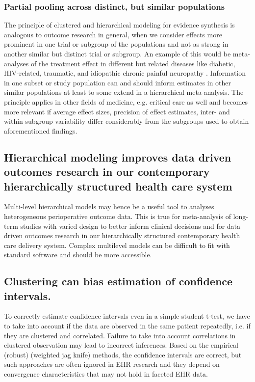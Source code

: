 \documentclass[11pt,notitlepage]{article}
\begin{document}
\subsubsection*{Partial pooling across distinct, but similar populations}
The principle  of clustered and hierarchical modeling for evidence synthesis is analogous to outcome research in general, when we consider effects more prominent in one trial or subgroup of the populations and not as strong in another similar but distinct trial or subgroup. An example of this would be meta-analyses of the treatment effect in different but related diseases like diabetic, HIV-related, traumatic, and idiopathic chronic painful neuropathy \cite{Andreae2015}. Information in one subset or study population can and should inform estimates in other similar populations at least to some extend in a hierarchical meta-analysis. The principle applies in other fields of medicine, e.g. critical care as well \cite{Roth2015CriticalCare} and becomes more relevant if average effect sizes, precision of effect estimates, inter- and within-subgroup variability differ considerably from the subgroups used to obtain aforementioned findings.

\subsection*{Hierarchical modeling improves data driven outcomes research in our contemporary hierarchically structured health care system}
 
Multi-level hierarchical models may hence be a useful tool to analyses heterogeneous perioperative outcome data. This is true for meta-analysis of long-term studies with varied design to better inform clinical decisions\cite{AndreaeJohnsonAbstract2013,Spiegelhalter2004bayesian} and for data driven outcomes research  in our hierarchically structured contemporary health care delivery system. Complex multilevel models can be difficult to fit with standard software and should be more accessible.

\subsection*{Clustering can bias estimation of confidence intervals.} To correctly estimate confidence intervals even in a simple student t-test, we have to take into account if the data are observed in the same patient repeatedly, i.e. if they are clustered and correlated. Failure to take into account correlations in clustered observation may lead to incorrect inferences. Based on the empirical (robust) (weighted jag knife) methods, the confidence intervals are correct, but such approaches are often ignored in EHR research and they depend on convergence characteristics that may not hold in faceted EHR data. 
\end{document}
